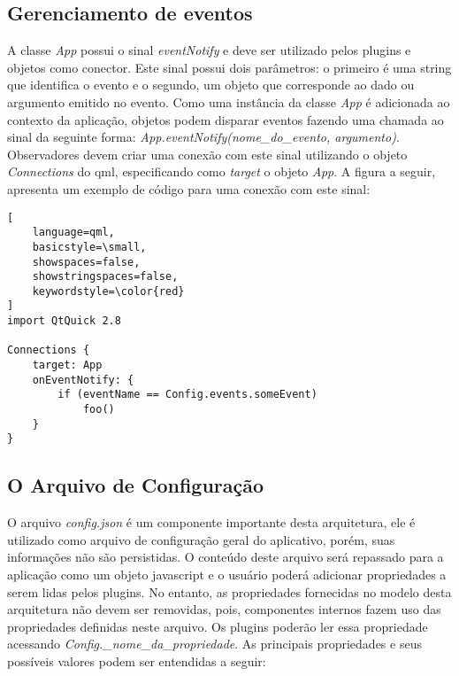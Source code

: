 \subsection{Gerenciamento de eventos}
A classe \textit{App} possui o sinal \textit{eventNotify} e deve ser utilizado pelos plugins e objetos como conector. Este sinal possui dois parâmetros: o primeiro é uma string que identifica o evento e o segundo, um objeto que corresponde ao dado ou argumento emitido no evento. Como uma instância da classe \textit{App} é adicionada ao contexto da aplicação, objetos podem disparar eventos fazendo uma chamada ao sinal da seguinte forma: \textit{App.eventNotify(nome\_do\_evento, argumento)}. Observadores devem criar uma conexão com este sinal utilizando o objeto \textit{Connections} do qml, especificando como \textit{target} o objeto \textit{App}. A figura a seguir, apresenta um exemplo de código para uma conexão com este sinal:

\begin{center}
\begin{lstlisting}[
	language=qml,
	basicstyle=\small,
	showspaces=false,
	showstringspaces=false,
	keywordstyle=\color{red}
]
import QtQuick 2.8

Connections {
    target: App
    onEventNotify: {
        if (eventName == Config.events.someEvent)
            foo()
    }
}
\end{lstlisting}
\end{center}


\subsection{O Arquivo de Configuração}\label{sec:solucao-desenvolvida}
O arquivo \textit{config.json} é um componente importante desta arquitetura, ele é utilizado como arquivo de configuração geral do aplicativo, porém, suas informações não são persistidas. O conteúdo deste arquivo será repassado para a aplicação como um objeto javascript e o usuário poderá adicionar propriedades a serem lidas pelos plugins. No entanto, as propriedades fornecidas no modelo desta arquitetura não devem ser removidas, pois, componentes internos fazem uso das propriedades definidas neste arquivo. Os plugins poderão ler essa propriedade acessando \textit{Config.\_nome\_da\_propriedade}. As principais propriedades e seus possíveis valores podem ser entendidas a seguir:

